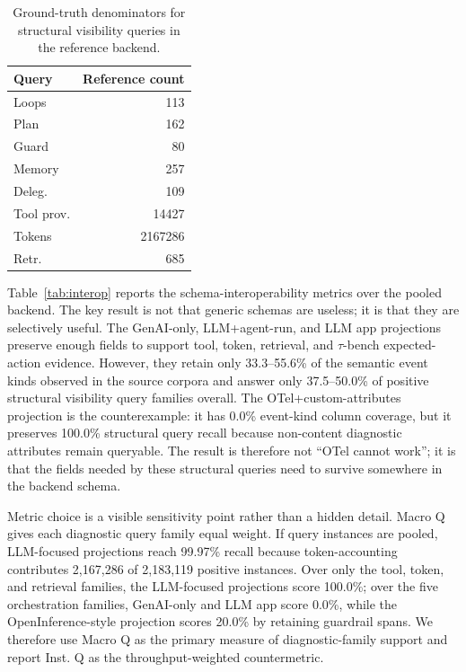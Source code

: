 \documentclass[conference]{IEEEtran}
\begin{document}
\begin{table}[t]
\centering
\scriptsize
\caption{Ground-truth denominators for structural visibility queries in
the reference backend.}
\label{tab:denominators}
\begin{tabular}{@{}lr@{}}
\toprule
Query & Reference count \\
\midrule
Loops & 113 \\
Plan & 162 \\
Guard & 80 \\
Memory & 257 \\
Deleg. & 109 \\
Tool prov. & 14427 \\
Tokens & 2167286 \\
Retr. & 685 \\
\bottomrule
\end{tabular}
\end{table}

Table~\ref{tab:interop} reports the schema-interoperability metrics over
the pooled backend. The key result is not that generic schemas are
useless; it is that they are selectively useful. The GenAI-only,
LLM+agent-run, and LLM app projections preserve enough fields to support
tool, token, retrieval, and $\tau$-bench expected-action evidence.
However, they retain only 33.3--55.6\% of the semantic event kinds
observed in the source corpora and answer only 37.5--50.0\% of positive
structural visibility query families overall. The OTel+custom-attributes
projection is the counterexample: it has 0.0\% event-kind column
coverage, but it preserves 100.0\% structural query recall because
non-content diagnostic attributes remain queryable. The result is
therefore not ``OTel cannot work''; it is that the fields needed by
these structural queries need to survive somewhere in the backend
schema.

Metric choice is a visible sensitivity point rather than a hidden
detail. Macro Q gives each diagnostic query family equal weight. If
query instances are pooled, LLM-focused projections reach 99.97\% recall
because token-accounting contributes 2,167,286 of 2,183,119 positive
instances. Over only the tool, token, and retrieval families, the
LLM-focused projections score 100.0\%; over the five orchestration
families, GenAI-only and LLM app score 0.0\%, while the
OpenInference-style projection scores 20.0\% by retaining guardrail
spans. We therefore use Macro Q as the primary measure of
diagnostic-family support and report Inst. Q as the throughput-weighted
countermetric.
\end{document}

